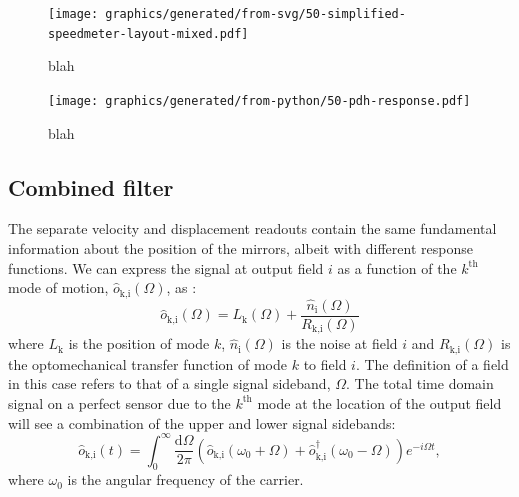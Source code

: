 \begin{figure}
  \centering
  \texttt{[image: graphics/generated/from-svg/50-simplified-speedmeter-layout-mixed.pdf]}
  \caption[Simplified layout of the \SSMEXPT{} including both displacement and velocity feedback paths]{\label{fig:simplified-speedmeter-layout-mixed}blah}
\end{figure}

\begin{figure}
  \centering
  \texttt{[image: graphics/generated/from-python/50-pdh-response.pdf]}
  \caption[Frequency response of the differential arm cavity degree of freedom to the Pound-Drever-Hall readout]{\label{fig:pdh-response}blah}
\end{figure}

\subsection{\label{sec:combined-filter}Combined filter}

The separate velocity and displacement readouts contain the same fundamental information about the position of the mirrors, albeit with different response functions. We can express the signal at output field $i$ as a function of the $k^{\textrm{th}}$ mode of motion, $\hat{o}_{\textrm{k,i}} \left( \Omega \right)$, as \cite{Kimble2001}:
\begin{equation}
  \label{eq:readout-signals}
  \hat{o}_{\textrm{k,i}} \left( \Omega \right) = L_{\textrm{k}}\left(\Omega\right) + \frac{\hat{n}_{\textrm{i}} \left( \Omega \right)}{R_{\textrm{k,i}} \left( \Omega \right)}
\end{equation}
where $L_{\textrm{k}}$ is the position of mode $k$, $\hat{n}_{\textrm{i}} \left( \Omega \right)$ is the noise at field $i$ and $R_{\textrm{k,i}} \left( \Omega \right)$ is the optomechanical transfer function of mode $k$ to field $i$. The definition of a field in this case refers to that of a single signal sideband, $\Omega$. The total time domain signal on a perfect sensor due to the $k^{\textrm{th}}$ mode at the location of the output field will see a combination of the upper and lower signal sidebands:
\begin{equation}
  \hat{o}_{\textrm{k,i}} \left( t \right) = \int_{0}^{\infty} \frac{\textrm{d} \Omega}{2 \pi} \left( \hat{o}_{\textrm{k,i}} \left( \omega_{0} + \Omega \right) + \hat{o}_{\textrm{k,i}}^\dag \left( \omega_{0} - \Omega \right) \right) e^{-i \Omega t},
\end{equation}
where $\omega_{0}$ is the angular frequency of the carrier.

